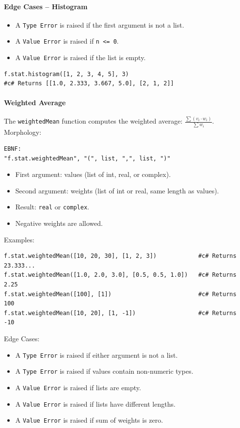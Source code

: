 \paragraph{Edge Cases -- Histogram}
\begin{itemize}
\item A \texttt{Type Error} is raised if the first argument is not a list.
\item A \texttt{Value Error} is raised if \texttt{n <= 0}.
\item A \texttt{Value Error} is raised if the list is empty.
\end{itemize}

\begin{verbatim}
f.stat.histogram([1, 2, 3, 4, 5], 3)
#c# Returns [[1.0, 2.333, 3.667, 5.0], [2, 1, 2]]
\end{verbatim}

\paragraph{Weighted Average}
The \texttt{weightedMean} function computes the weighted average: $\frac{\sum(v_i \cdot w_i)}{\sum w_i}$.\\
Morphology:
\begin{verbatim}
EBNF:
"f.stat.weightedMean", "(", list, ",", list, ")"
\end{verbatim}
\begin{itemize}
\item First argument: values (list of int, real, or complex).
\item Second argument: weights (list of int or real, same length as values).
\item Result: \texttt{real} or \texttt{complex}.
\item Negative weights are allowed.
\end{itemize}

Examples:
\begin{verbatim}
f.stat.weightedMean([10, 20, 30], [1, 2, 3])            #c# Returns 23.333...
f.stat.weightedMean([1.0, 2.0, 3.0], [0.5, 0.5, 1.0])   #c# Returns 2.25
f.stat.weightedMean([100], [1])                         #c# Returns 100
f.stat.weightedMean([10, 20], [1, -1])                  #c# Returns -10
\end{verbatim}

Edge Cases:
\begin{itemize}
\item A \texttt{Type Error} is raised if either argument is not a list.
\item A \texttt{Type Error} is raised if values contain non-numeric types.
\item A \texttt{Value Error} is raised if lists are empty.
\item A \texttt{Value Error} is raised if lists have different lengths.
\item A \texttt{Value Error} is raised if sum of weights is zero.
\end{itemize}

